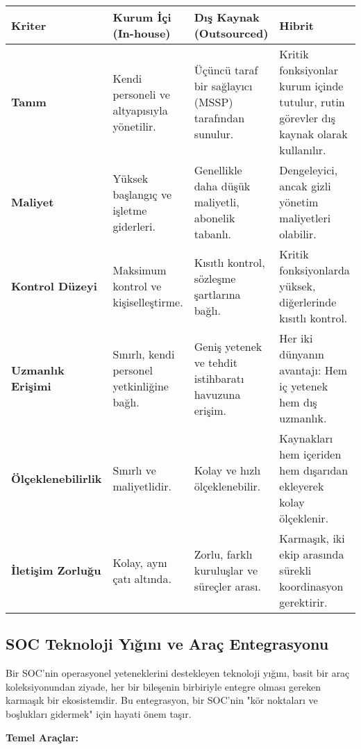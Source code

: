 \begin{longtable}{|p{2.5cm}|p{3cm}|p{3cm}|p{3cm}|}
\hline
\textbf{Kriter} & \textbf{Kurum İçi (In-house)} & \textbf{Dış Kaynak (Outsourced)} & \textbf{Hibrit} \\
\hline
\textbf{Tanım} & Kendi personeli ve altyapısıyla yönetilir. & Üçüncü taraf bir sağlayıcı (MSSP) tarafından sunulur. & Kritik fonksiyonlar kurum içinde tutulur, rutin görevler dış kaynak olarak kullanılır. \\
\hline
\textbf{Maliyet} & Yüksek başlangıç ve işletme giderleri. & Genellikle daha düşük maliyetli, abonelik tabanlı. & Dengeleyici, ancak gizli yönetim maliyetleri olabilir. \\
\hline
\textbf{Kontrol Düzeyi} & Maksimum kontrol ve kişiselleştirme. & Kısıtlı kontrol, sözleşme şartlarına bağlı. & Kritik fonksiyonlarda yüksek, diğerlerinde kısıtlı kontrol. \\
\hline
\textbf{Uzmanlık Erişimi} & Sınırlı, kendi personel yetkinliğine bağlı. & Geniş yetenek ve tehdit istihbaratı havuzuna erişim. & Her iki dünyanın avantajı: Hem iç yetenek hem dış uzmanlık. \\
\hline
\textbf{Ölçeklenebilirlik} & Sınırlı ve maliyetlidir. & Kolay ve hızlı ölçeklenebilir. & Kaynakları hem içeriden hem dışarıdan ekleyerek kolay ölçeklenir. \\
\hline
\textbf{İletişim Zorluğu} & Kolay, aynı çatı altında. & Zorlu, farklı kuruluşlar ve süreçler arası. & Karmaşık, iki ekip arasında sürekli koordinasyon gerektirir. \\
\hline
\end{longtable}

\subsection{SOC Teknoloji Yığını ve Araç Entegrasyonu}

Bir SOC'nin operasyonel yeteneklerini destekleyen teknoloji yığını, basit bir araç koleksiyonundan ziyade, her bir bileşenin birbiriyle entegre olması gereken karmaşık bir ekosistemdir. Bu entegrasyon, bir SOC'nin "kör noktaları ve boşlukları gidermek" için hayati önem taşır.

\textbf{Temel Araçlar:}

